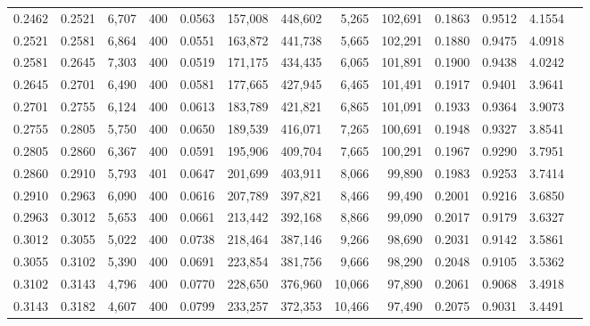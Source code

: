 \begin{tabular}{rrrrrrrrrrrrr}
0.2462 & 0.2521 &  6,707 & 400 &                                     0.0563 & 157,008 & 448,602 &   5,265 & 102,691 & 0.1863 & 0.9512 & 4.1554 \\
0.2521 & 0.2581 &  6,864 & 400 &                                     0.0551 & 163,872 & 441,738 &   5,665 & 102,291 & 0.1880 & 0.9475 & 4.0918 \\
0.2581 & 0.2645 &  7,303 & 400 &                                     0.0519 & 171,175 & 434,435 &   6,065 & 101,891 & 0.1900 & 0.9438 & 4.0242 \\
0.2645 & 0.2701 &  6,490 & 400 &                                     0.0581 & 177,665 & 427,945 &   6,465 & 101,491 & 0.1917 & 0.9401 & 3.9641 \\
0.2701 & 0.2755 &  6,124 & 400 &                                     0.0613 & 183,789 & 421,821 &   6,865 & 101,091 & 0.1933 & 0.9364 & 3.9073 \\
0.2755 & 0.2805 &  5,750 & 400 &                                     0.0650 & 189,539 & 416,071 &   7,265 & 100,691 & 0.1948 & 0.9327 & 3.8541 \\
0.2805 & 0.2860 &  6,367 & 400 &                                     0.0591 & 195,906 & 409,704 &   7,665 & 100,291 & 0.1967 & 0.9290 & 3.7951 \\
0.2860 & 0.2910 &  5,793 & 401 &                                     0.0647 & 201,699 & 403,911 &   8,066 &  99,890 & 0.1983 & 0.9253 & 3.7414 \\
0.2910 & 0.2963 &  6,090 & 400 &                                     0.0616 & 207,789 & 397,821 &   8,466 &  99,490 & 0.2001 & 0.9216 & 3.6850 \\
0.2963 & 0.3012 &  5,653 & 400 &                                     0.0661 & 213,442 & 392,168 &   8,866 &  99,090 & 0.2017 & 0.9179 & 3.6327 \\
0.3012 & 0.3055 &  5,022 & 400 &                                     0.0738 & 218,464 & 387,146 &   9,266 &  98,690 & 0.2031 & 0.9142 & 3.5861 \\
0.3055 & 0.3102 &  5,390 & 400 &                                     0.0691 & 223,854 & 381,756 &   9,666 &  98,290 & 0.2048 & 0.9105 & 3.5362 \\
0.3102 & 0.3143 &  4,796 & 400 &                                     0.0770 & 228,650 & 376,960 &  10,066 &  97,890 & 0.2061 & 0.9068 & 3.4918 \\
0.3143 & 0.3182 &  4,607 & 400 &                                     0.0799 & 233,257 & 372,353 &  10,466 &  97,490 & 0.2075 & 0.9031 & 3.4491 \\

\end{tabular}
